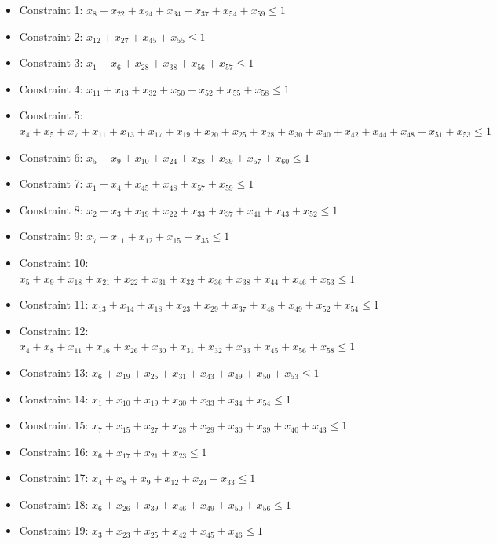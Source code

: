 \documentclass[11pt]{article}
\begin{document}
\begin{itemize}
\item Constraint 1: $x_{8} + x_{22} + x_{24} + x_{34} + x_{37} + x_{54} + x_{59} \le 1$
\item Constraint 2: $x_{12} + x_{27} + x_{45} + x_{55} \le 1$
\item Constraint 3: $x_{1} + x_{6} + x_{28} + x_{38} + x_{56} + x_{57} \le 1$
\item Constraint 4: $x_{11} + x_{13} + x_{32} + x_{50} + x_{52} + x_{55} + x_{58} \le 1$
\item Constraint 5: $x_{4} + x_{5} + x_{7} + x_{11} + x_{13} + x_{17} + x_{19} + x_{20} + x_{25} + x_{28} + x_{30} + x_{40} + x_{42} + x_{44} + x_{48} + x_{51} + x_{53} \le 1$
\item Constraint 6: $x_{5} + x_{9} + x_{10} + x_{24} + x_{38} + x_{39} + x_{57} + x_{60} \le 1$
\item Constraint 7: $x_{1} + x_{4} + x_{45} + x_{48} + x_{57} + x_{59} \le 1$
\item Constraint 8: $x_{2} + x_{3} + x_{19} + x_{22} + x_{33} + x_{37} + x_{41} + x_{43} + x_{52} \le 1$
\item Constraint 9: $x_{7} + x_{11} + x_{12} + x_{15} + x_{35} \le 1$
\item Constraint 10: $x_{5} + x_{9} + x_{18} + x_{21} + x_{22} + x_{31} + x_{32} + x_{36} + x_{38} + x_{44} + x_{46} + x_{53} \le 1$
\item Constraint 11: $x_{13} + x_{14} + x_{18} + x_{23} + x_{29} + x_{37} + x_{48} + x_{49} + x_{52} + x_{54} \le 1$
\item Constraint 12: $x_{4} + x_{8} + x_{11} + x_{16} + x_{26} + x_{30} + x_{31} + x_{32} + x_{33} + x_{45} + x_{56} + x_{58} \le 1$
\item Constraint 13: $x_{6} + x_{19} + x_{25} + x_{31} + x_{43} + x_{49} + x_{50} + x_{53} \le 1$
\item Constraint 14: $x_{1} + x_{10} + x_{19} + x_{30} + x_{33} + x_{34} + x_{54} \le 1$
\item Constraint 15: $x_{7} + x_{15} + x_{27} + x_{28} + x_{29} + x_{30} + x_{39} + x_{40} + x_{43} \le 1$
\item Constraint 16: $x_{6} + x_{17} + x_{21} + x_{23} \le 1$
\item Constraint 17: $x_{4} + x_{8} + x_{9} + x_{12} + x_{24} + x_{33} \le 1$
\item Constraint 18: $x_{6} + x_{26} + x_{39} + x_{46} + x_{49} + x_{50} + x_{56} \le 1$
\item Constraint 19: $x_{3} + x_{23} + x_{25} + x_{42} + x_{45} + x_{46} \le 1$

\end{itemize}
\end{document}

